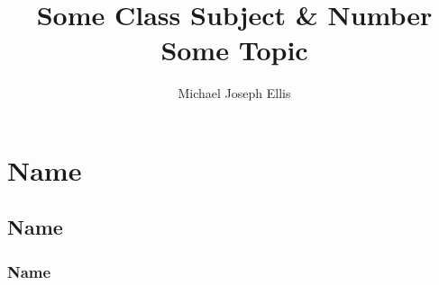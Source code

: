 \documentclass[11pt]{report}
\title{\Huge{Some Class Subject \& Number}\\Some Topic}
\author{\huge{Michael Joseph Ellis}}
\date{}
\begin{document}

\maketitle
\newpage %
\tableofcontents
\pagebreak

\chapter{Name}

\section{Name}
\chaptertheorem{}{}
\chapterclaim{}{}
\chaptercorollary{}{}
\chapterdefinition{}{}
\chapterexample{}{}
\chapterexercise{}{}
\chapterlemma{}{}
\chapterproposition{}{}
\chapterquestion{}{}
\chaptersolution{}{}

\subsection{Name}
\sectiontheorem{}{}
\sectionclaim{}{}
\sectioncorollary{}{}
\sectiondefinition{}{}
\sectionexample{}{}
\sectionexercise{}{}
\sectionlemma{}{}
\sectionproposition{}{}
\sectionquestion{}{}
\sectionsolution{}{}
\end{document}
